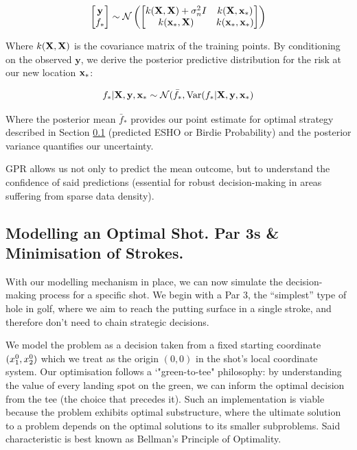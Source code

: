 \documentclass[11pt, letterpaper]{article}
\begin{document}
\begin{align*}
    \begin{bmatrix}
        \mathbf{y}\\
        f_*
    \end{bmatrix} \sim 
    \mathcal{N}\left (\begin{bmatrix}
        k(\mathbf{X},\mathbf{X}) + \sigma^2_nI & k(\mathbf{X},\mathbf{x}_*) \\
        k(\mathbf{x}_*, \mathbf{X}) & k(\mathbf{x}_*, \mathbf{x}_*)
    \end{bmatrix}\right)
\end{align*}

Where $k(\mathbf{X},\mathbf{X})$ is the covariance matrix of the training points. By conditioning on the observed $\mathbf{y}$, we derive the posterior predictive distribution for the risk at our new location $\mathbf{x}_*$:

\[f_* |\mathbf{X}, \mathbf{y}, \mathbf{x}_* \sim \mathcal{N}(\bar f_*, \text{Var}(f_* | \mathbf{X}, \mathbf{y}, \mathbf{x}_*)\]

Where the posterior mean $\bar f_*$ provides our point estimate for optimal strategy described in Section \ref{subsec:par3} (predicted ESHO or Birdie Probability) and the posterior variance quantifies our uncertainty.

GPR allows us not only to predict the mean outcome, but to understand the confidence of said predictions (essential for robust decision-making in areas suffering from sparse data density).

\subsection{Modelling an Optimal Shot. Par 3s \& Minimisation of Strokes.}

\label{subsec:par3}

With our modelling mechanism in place, we can now simulate the decision-making process for a specific shot. We begin with a Par 3, the ``simplest'' type of hole in golf, where we aim to reach the putting surface in a single stroke, and therefore don't need to chain strategic decisions. 

We model the problem as a decision taken from a fixed starting coordinate $(x_1^0,x_2^0)$ which we treat as the origin $(0,0)$ in the shot's local coordinate system. Our optimisation follows a `"green-to-tee" philosophy: by understanding the value of every landing spot on the green, we can inform the optimal decision from the tee (the choice that precedes it). Such an implementation is viable because the problem exhibits optimal substructure, where the ultimate solution to a problem depends on the optimal solutions to its smaller subproblems. Said characteristic is best known as Bellman's Principle of Optimality\parencite{rosu_bellman}.
\end{document}
